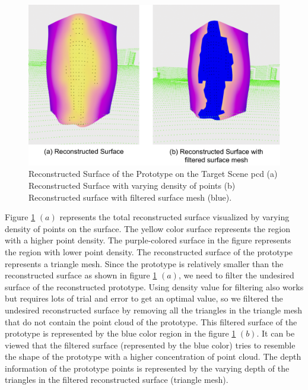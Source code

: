 \begin{figure}[htbp]
    \centering
    \includegraphics[width=1\linewidth]{97_graphics/results/surface_reconstruction.pdf}
    \caption[Reconstructed Surface of the Prototype on the Target Scene \acrshort{pcd}.]{Reconstructed Surface of the Prototype on the Target Scene \acrshort{pcd} (a) Reconstructed Surface with varying density of points (b) Reconstructed surface with filtered surface mesh (blue).}
    \label{fig:result-surface_reconstruction}
\end{figure}

Figure \ref{fig:result-surface_reconstruction} \((a)\) represents the total reconstructed surface visualized by varying density of points on the surface. The yellow color surface represents the region with a higher point density. The purple-colored surface in the figure represents the region with lower point density. The reconstructed surface of the prototype represents a triangle mesh. Since the prototype is relatively smaller than the reconstructed surface as shown in figure \ref{fig:result-surface_reconstruction} \((a)\), we need to filter the undesired surface of the reconstructed prototype. Using density value for filtering also works but requires lots of trial and error to get an optimal value, so we filtered the undesired reconstructed surface by removing all the triangles in the triangle mesh that do not contain the point cloud of the prototype. This filtered surface of the prototype is represented by the blue color region in the figure \ref{fig:result-surface_reconstruction} \((b)\). It can be viewed that the filtered surface (represented by the blue color) tries to resemble the shape of the prototype with a higher concentration of point cloud. The depth information of the prototype points is represented by the varying depth of the triangles in the filtered reconstructed surface (triangle mesh).

